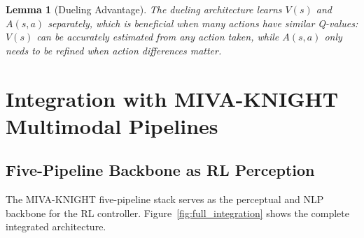 \documentclass[12pt,a4paper]{article}
\theoremstyle{definition}
\theoremstyle{plain}
\newtheorem{lemma}[theorem]{Lemma}
\theoremstyle{remark}
\begin{document}
\begin{lemma}[Dueling Advantage]
The dueling architecture learns $V(s)$ and $A(s,a)$ separately, which is beneficial when many actions have similar Q-values: $V(s)$ can be accurately estimated from any action taken, while $A(s,a)$ only needs to be refined when action differences matter.
\end{lemma}

\newpage
\section{Integration with MIVA-KNIGHT Multimodal Pipelines}
\label{sec:integration}

\subsection{Five-Pipeline Backbone as RL Perception}

The MIVA-KNIGHT five-pipeline stack serves as the perceptual and NLP backbone for the RL controller. Figure~\ref{fig:full_integration} shows the complete integrated architecture.
\end{document}
